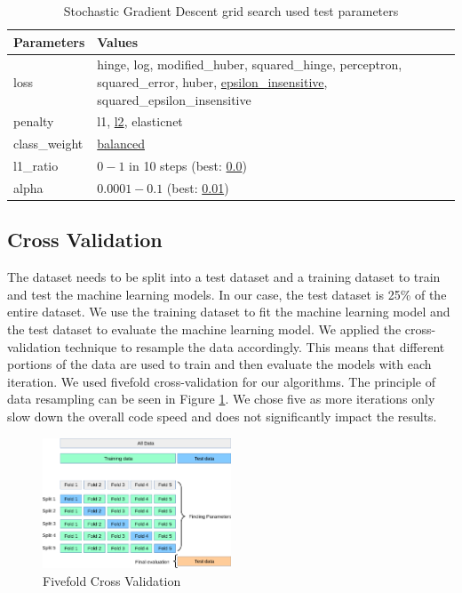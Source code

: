 \documentclass[11pt]{article}
\renewcommand{\arraystretch}{1.3}
\begin{document}
	\begin{table}[H]
		\renewcommand{\arraystretch}{1.3}
		\centering
		\begin{tabularx}{\textwidth}{lX}
			Parameters & Values \\
			\toprule
			loss &  hinge, log, modified\_huber, squared\_hinge, perceptron, squared\_error, huber, \underline{epsilon\_insensitive}, squared\_epsilon\_insensitive\\
			penalty & l1, \underline{l2}, elasticnet   \\
			class\_weight & \underline{balanced}\\
			l1\_ratio & $0-1$ in 10 steps (best: \underline{0.0})\\
			alpha & $0.0001 - 0.1$ (best: \underline{0.01})\\
		\end{tabularx}
		\caption{Stochastic Gradient Descent grid search used test parameters}
		\label{tab:SGDParameters}
	\end{table}


	
	\subsection{Cross Validation}
	The dataset needs to be split into a test dataset and a training dataset to train and test the machine learning models. In our case, the test dataset is 25\% of the entire dataset. We use the training dataset to fit the machine learning model and the test dataset to evaluate the machine learning model. We applied the cross-validation technique to resample the data accordingly. This means that different portions of the data are used to train and then evaluate the models with each iteration. We used fivefold cross-validation for our algorithms. The principle of data resampling can be seen in Figure \ref{fig:crossValidation}. We chose five as more iterations only slow down the overall code speed and does not significantly impact the results.
	\begin{figure}[H]
		\centering
		\includegraphics[width=0.5\textwidth]{img/grid_search_cross_validation.png}
		\caption{Fivefold Cross Validation \cite{scikit}}
		\label{fig:crossValidation}
	\end{figure}
\end{document}
